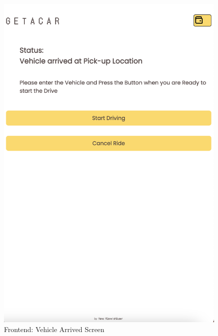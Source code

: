 \begin{figure}[h]
\begin{minipage}{0.45\linewidth}
        \includegraphics[width=\linewidth]{data/ffss/8.png}
        \caption{Frontend: Vehicle Arrived Screen}
        \label{fig:VehicleArrivedScreen}
    \end{minipage}
    
\end{figure}



